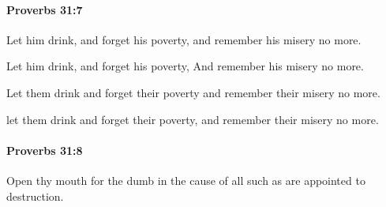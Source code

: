 		\paragraph{Proverbs 31:7} %
			\label{PROVERBS-31-7}

			Let him drink, and forget his poverty, and remember his misery no more.

			\begin{versebox}
					\item[BHS] 
					\item[ASV] Let him drink, and forget his poverty, And remember his misery no more.
					\item[NIV] Let them drink and forget their poverty and remember their misery no more.
					\item[NRSV] let them drink and forget their poverty, and remember their misery no more.
			\end{versebox}

		\paragraph{Proverbs 31:8} %
			\label{PROVERBS-31-8}

			Open thy mouth for the dumb in the cause of all such as are appointed to destruction.

